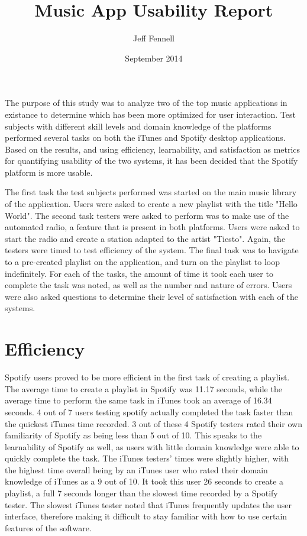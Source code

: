 \documentclass[12pt]{report}
\begin{document}
\title{Music App Usability Report}
\author{Jeff Fennell}
\date{September 2014}
\maketitle

The purpose of this study was to analyze two of the top music applications in existance to determine which has been more optimized for user interaction. Test subjects with different skill levels and domain knowledge of the platforms performed several tasks on both the iTunes and Spotify desktop applications. Based on the results, and using efficiency, learnability, and satisfaction as metrics for quantifying usability of the two systems, it has been decided that the Spotify platform is more usable.

The first task the test subjects performed was started on the main music library of the application. Users were asked to create a new playlist with the title "Hello World".  The second task testers were asked to perform was to make use of the automated radio, a feature that is present in both platforms. Users were asked to start the radio and create a station adapted to the artist "Tiesto". Again, the testers were timed to test efficiency of the system. The final task was to havigate to a pre-created playlist on the application, and turn on the playlist to loop indefinitely. For each of the tasks, the amount of time it took each user to complete the task was noted, as well as the number and nature of errors. Users were also asked questions to determine their level of satisfaction with each of the systems.

\section{Efficiency}

Spotify users proved to be more efficient in the first task of creating a playlist. The average time to create a playlist in Spotify was 11.17 seconds, while the average time to perform the same task in iTunes took an average of 16.34 seconds. 4 out of 7 users testing spotify actually completed the task faster than the quickest iTunes time recorded. 3 out of these 4 Spotify testers rated their own familiarity of Spotify as being less than 5 out of 10. This speaks to the learnability of Spotify as well, as users with little domain knowledge were able to quickly complete the task. The iTunes testers' times were slightly higher, with the highest time overall being by an iTunes user who rated their domain knowledge of iTunes as a 9 out of 10. It took this user 26 seconds to create a playlist, a full 7 seconds longer than the slowest time recorded by a Spotify tester. The slowest iTunes tester noted that iTunes frequently updates the user interface, therefore making it difficult to stay familiar with how to use certain features of the software.
\end{document}
